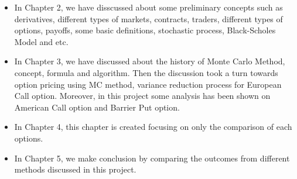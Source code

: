\begin{itemize}
	\item In Chapter 2, we have disscussed about some preliminary concepts such as
	derivatives, different types of markets, contracts, traders, different types of
	options, payoffs, some basic definitions, stochastic process, Black-Scholes Model and etc.
	\item In Chapter 3, we have discussed about the history of Monte Carlo Method, concept, formula and algorithm. Then the discussion took a turn towards option pricing using MC method, variance reduction process for European Call option. Moreover, in this project some analysis has been shown on American Call option and Barrier Put option.
	\item In Chapter 4, this chapter is created focusing on only the comparison of each options.
	\item In Chapter 5, we make conclusion by comparing the outcomes from different
	methods discussed in this project.
\end{itemize}